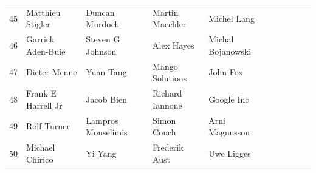 \begin{table}[h]
\begin{center}
{\begin{tabular}{llllllllll}
 45 & Matthieu Stigler & Duncan Murdoch & Martin Maechler & Michel Lang \\
 46 & Garrick Aden-Buie & Steven G Johnson & Alex Hayes & Michal Bojanowski \\
 47 & Dieter Menne & Yuan Tang & Mango Solutions & John Fox \\
 48 & Frank E Harrell Jr & Jacob Bien & Richard Iannone & Google Inc \\
 49 & Rolf Turner & Lampros Mouselimis & Simon Couch & Arni Magnusson \\
 50 & Michael Chirico & Yi Yang & Frederik Aust & Uwe Ligges \\
\bottomrule
\end{tabular}
}
\end{center}
\end{table}

	


